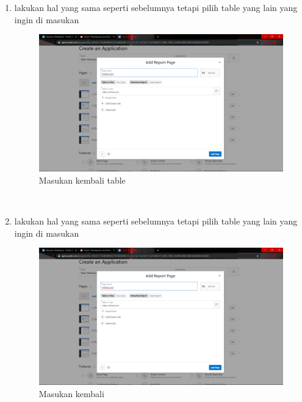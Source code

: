 \begin{enumerate}
\item lakukan hal yang sama seperti sebelumnya tetapi pilih table yang lain yang ingin di masukan
\begin{figure}[H]
    \centering
    \includegraphics[scale=0.2]{figures/23}
    \caption{Masukan kembali table}
    \label{Hello World}
\end{figure} \\

\item lakukan hal yang sama seperti sebelumnya tetapi pilih table yang lain yang ingin di masukan
\begin{figure}[H]
    \centering
    \includegraphics[scale=0.2]{figures/23}
    \caption{Masukan kembali}
    \label{Automatic1}
\end{figure} \\


\end{enumerate}
